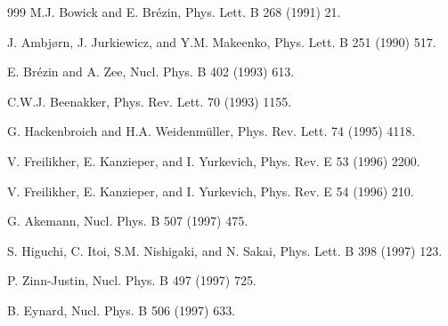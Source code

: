 \begin{thebibliography}{999}
      M.J. Bowick and E. Br\'ezin,
                      Phys. Lett. B 268 (1991) 21.       %

          J. Ambj{\o}rn, J. Jurkiewicz, and Y.M. Makeenko, 
                      Phys. Lett. B 251 (1990) 517.      %

      E. Br\'ezin and A. Zee, 
                      Nucl. Phys. B 402 (1993) 613.      %

      C.W.J. Beenakker, 
                      Phys. Rev. Lett. 70 (1993) 1155.       %

      G. Hackenbroich and H.A. Weidenm\"uller,
                      Phys. Rev. Lett. 74 (1995) 4118.       %

      V. Freilikher, E. Kanzieper, and I. Yurkevich,
                      Phys. Rev. E 53 (1996) 2200.        %

      V. Freilikher, E. Kanzieper, and I. Yurkevich,
                      Phys. Rev. E 54 (1996) 210.         %

         G. Akemann,
                      Nucl. Phys. B 507 (1997) 475.       %

          S. Higuchi, C. Itoi, S.M. Nishigaki, and N. Sakai,
                      Phys. Lett. B 398 (1997) 123.        %

      P. Zinn-Justin, 
                      Nucl. Phys. B 497 (1997) 725.             %

      B. Eynard, 
                      Nucl. Phys. B 506 (1997) 633.             %


\end{thebibliography}
